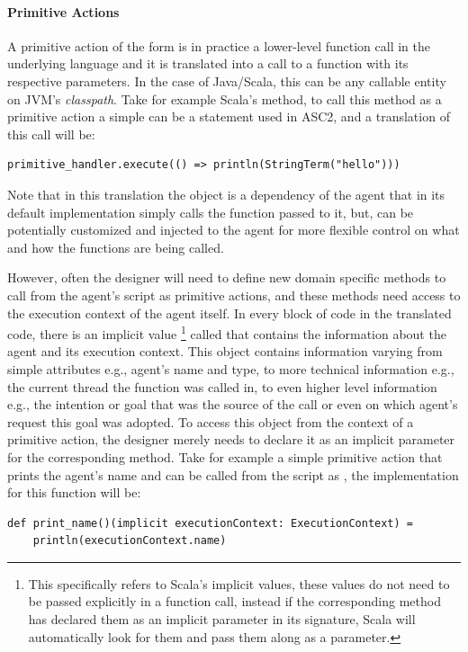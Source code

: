 \paragraph{Primitive Actions}
A primitive action of the form  is in practice a lower-level function call in the underlying language and it %
is translated into a call to a function  with its respective parameters. In the case of Java/Scala, this can be any callable entity on JVM's \textit{classpath}. Take for example Scala's  method, to call this method as a primitive action a simple  can be a statement used in ASC2, and a translation of this call will be:
\begin{verbatim}
primitive_handler.execute(() => println(StringTerm("hello")))
\end{verbatim}
\noindent Note that in this translation the object  is a dependency of the agent that in its default implementation simply calls the function passed to it, but, can be potentially customized and injected to the agent for more flexible control on what and how the functions are being called.

However, often the designer will need to define new domain specific methods to call from the agent's script as primitive actions, and these methods need access to the execution context of the agent itself. In every block of code in the translated code, there is an implicit value \footnote{This specifically refers to Scala's implicit values, these values do not need to be passed explicitly in a function call, instead if the corresponding method has declared them as an implicit parameter in its signature, Scala will automatically look for them and pass them along as a parameter.} called  that contains the information about the agent and its execution context. This object contains information varying from simple attributes e.g., agent's name and type, to more technical information e.g., the current thread the function was called in, to even higher level information e.g., the intention or goal that was the source of the call or even on which agent's request this goal was adopted. To access this object from the context of a primitive action, the designer merely needs to declare it as an implicit parameter for the corresponding method. Take for example a simple primitive action that prints the agent's name and can be called from the script as , the implementation for this function will be:
\begin{verbatim}
def print_name()(implicit executionContext: ExecutionContext) =
    println(executionContext.name)
\end{verbatim}

